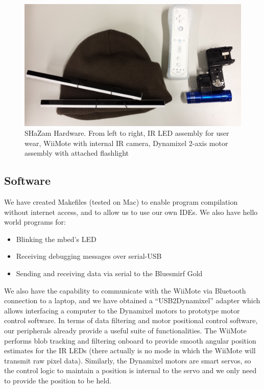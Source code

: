 \documentclass[conference, twocolumn]{IEEEtran}
\begin{document}
\begin{figure}[!t]
\begin{center}
\includegraphics[width=\linewidth]{../images/hw_mk0}
\end{center}

\caption{SHaZam Hardware. From left to right, IR LED assembly for user wear, WiiMote with internal IR camera, Dynamixel 2-axis motor assembly with attached flashlight}
\label{fig:hw_mk0}
\end{figure}

\subsection{Software}
We have created Makefiles (tested on Mac) to enable program compilation without internet access, and to allow us to use our own IDEs.
We also have hello world programs for:
\begin{itemize}
\item Blinking the mbed's LED
\item Receiving debugging messages over serial-USB
\item Sending and receiving data via serial to the Bluesmirf Gold
\end{itemize}

We also have the capability to communicate with the WiiMote via Bluetooth connection to a laptop, and we have obtained a ``USB2Dynamixel'' adapter which allows interfacing a computer to the Dynamixel motors to prototype motor control software.
In terms of data filtering and motor positional control software, our peripherals already provide a useful suite of functionalities. The WiiMote performs blob tracking and filtering onboard to provide smooth angular position estimates for the IR LEDs (there actually is no mode in which the WiiMote will transmit raw pixel data). Similarly, the Dynamixel motors are smart servos, so the control logic to maintain a position is internal to the servo and we only need to provide the position to be held.
\end{document}
